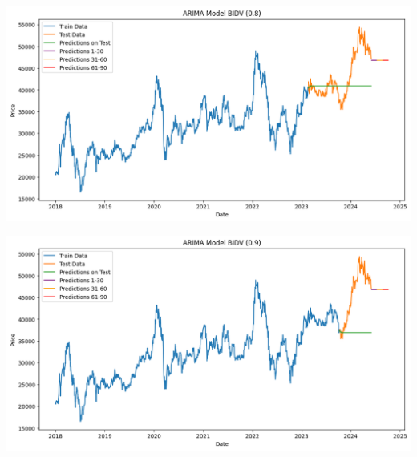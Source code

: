 \documentclass[conference]{IEEEtran}
\begin{document}
\begin{minipage}{0.21\textwidth}
    \centering
    \includegraphics[width=\linewidth]{images/ARIMA/ARIMA_BIDV_82.png}
    \label{fig:image1}
\end{minipage}
\hfill
\begin{minipage}{0.21\textwidth}
    \centering
    \includegraphics[width=\linewidth]{images/ARIMA/ARIMA_BIDV_91.png}
    \label{fig:image2}
\end{minipage}
\end{document}
